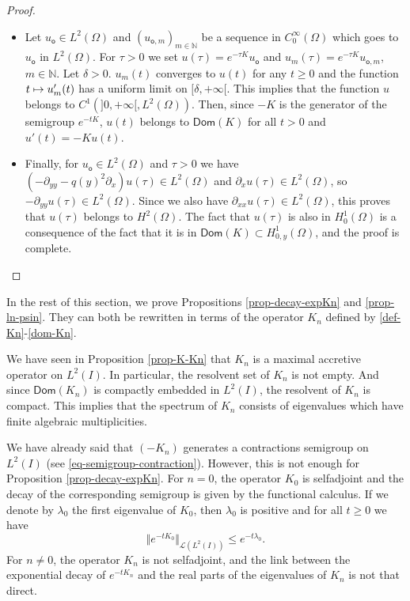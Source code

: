 \documentclass[JEP,XML,SOM,Unicode]{cedram}
\let\mathcal\mathscr
\def\mto{\mathchoice{\longmapsto}{\mapsto}{\mapsto}{\mapsto}}
\theoremstyle{plain}
\theoremstyle{definition}
\newcommand{\nr}[1]{\Vert #1\Vert}
\newcommand{\1}{\mathds 1}
\newcommand{\Dom}{\mathsf{Dom}}
\newcommand{\N}{\mathbb{N}}
\let\d\delta
\let\l\lambda
\let\O\Omega
\newcommand{\Lc}{{\mathcal L}}
\newcommand{\uo}{u_{\mathsf{o}}}
\newcommand{\uom}{u_{\mathsf{o},m}}
\begin{document}
\begin{proof}
\begin{itemize}
\item
Let $\uo \in L^2(\O)$ and $(\uom)_{m \in \N}$ be a sequence in $C_0^\infty(\O)$ which goes to $\uo$ in $L^2(\O)$. For $\tau > 0$ we set $u(\tau) = e^{-\tau K} \uo$ and $u_m(\tau) = e^{-\tau K} \uom$, $m \in \N$. Let $\d > 0$. $u_m(t)$ converges to $u(t)$ for any $t \geq 0$ and the function $t \mto u_m'(t)$ has a uniform limit on $[\d,+\infty[$. This implies that the function $u$ belongs to $C^1(]0,+\infty[,L^2(\O))$. Then, since $-K$ is the generator of the semigroup $e^{-tK}$, $u(t)$ belongs to $\Dom(K)$ for all $t > 0$ and $u'(t) = -K u(t)$.

\item
Finally, for $\uo \in L^2(\O)$ and $\tau > 0$ we have $(-\partial_{yy} - q(y)^2 \partial_x) u(\tau) \in L^2(\O)$ and $\partial_x u(\tau) \in L^2(\O)$, so $-\partial_{yy}u(\tau) \in L^2(\O)$. Since we also have $\partial_{xx}u(\tau) \in L^2(\O)$, this proves that $u(\tau)$ belongs to $H^2(\O)$. The fact that $u(\tau)$ is also in $H_0^1(\O)$ is a consequence of the fact that it is in $\Dom(K) \subset H^1_{0,y}(\O)$, and the proof is complete.\qedhere
\end{itemize}
\end{proof}


In the rest of this section, we prove Propositions \ref{prop-decay-expKn} and \ref{prop-ln-psin}. They can both be rewritten in terms of the operator $K_n$ defined by \eqref{def-Kn}-\eqref{dom-Kn}.

We have seen in Proposition \ref{prop-K-Kn} that $K_n$ is a maximal accretive operator on $L^2(I)$. In particular, the resolvent set of $K_n$ is not empty. And since $\Dom(K_n)$ is compactly embedded in $L^2(I)$, the resolvent of $K_n$ is compact. This implies that the spectrum of $K_n$ consists of eigenvalues which have finite algebraic multiplicities.

We have already said that $(-K_n)$ generates a contractions semigroup on $L^2(I)$ (see \eqref{eq-semigroup-contraction}). However, this is not enough for Proposition \ref{prop-decay-expKn}. For $n = 0$, the operator $K_0$ is selfadjoint and the decay of the corresponding semigroup is given by the functional calculus. If we denote by $\l_0$ the first eigenvalue of $K_0$, then $\l_0$ is positive and for all $t \geq 0$ we have
\[
\nr{e^{-t K_0}}_{\Lc(L^2(I))} \leq e^{-t\l_0}.
\]
For $n \neq 0$, the operator $K_n$ is not selfadjoint, and the link between the exponential decay of $e^{-tK_n}$ and the real parts of the eigenvalues of $K_n$ is not that direct.
\end{document}
